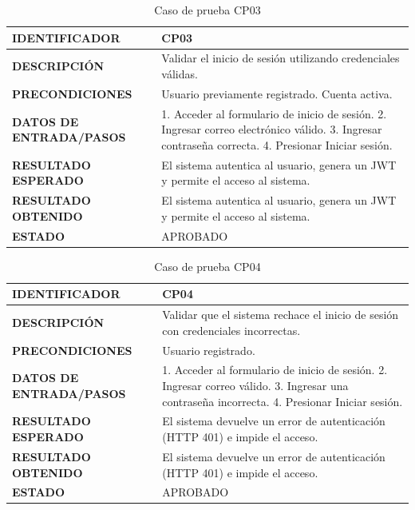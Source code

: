 \begin{table}[H]
\centering
\caption{Caso de prueba CP03}
\begin{tabular}{|p{3.5cm}|p{10.3cm}|}
\hline
\textbf{IDENTIFICADOR} & CP03 \\
\hline
\textbf{DESCRIPCIÓN} & Validar el inicio de sesión utilizando credenciales válidas. \\
\hline
\textbf{PRECONDICIONES} & Usuario previamente registrado. Cuenta activa. \\
\hline
\textbf{DATOS DE ENTRADA/PASOS} & 1. Acceder al formulario de inicio de sesión. 2. Ingresar correo electrónico válido. 3. Ingresar contraseña correcta. 4. Presionar Iniciar sesión. \\
\hline
\textbf{RESULTADO ESPERADO} & El sistema autentica al usuario, genera un JWT y permite el acceso al sistema. \\
\hline
\textbf{RESULTADO OBTENIDO} & El sistema autentica al usuario, genera un JWT y permite el acceso al sistema. \\
\hline
\textbf{ESTADO} & APROBADO \\
\hline
\end{tabular}
\end{table}

\begin{table}[H]
\centering
\caption{Caso de prueba CP04}
\begin{tabular}{|p{3.5cm}|p{10.3cm}|}
\hline
\textbf{IDENTIFICADOR} & CP04 \\
\hline
\textbf{DESCRIPCIÓN} & Validar que el sistema rechace el inicio de sesión con credenciales incorrectas. \\
\hline
\textbf{PRECONDICIONES} & Usuario registrado. \\
\hline
\textbf{DATOS DE ENTRADA/PASOS} & 1. Acceder al formulario de inicio de sesión. 2. Ingresar correo válido. 3. Ingresar una contraseña incorrecta. 4. Presionar Iniciar sesión. \\
\hline
\textbf{RESULTADO ESPERADO} & El sistema devuelve un error de autenticación (HTTP 401) e impide el acceso. \\
\hline
\textbf{RESULTADO OBTENIDO} & El sistema devuelve un error de autenticación (HTTP 401) e impide el acceso. \\
\hline
\textbf{ESTADO} & APROBADO \\
\hline
\end{tabular}
\end{table}

